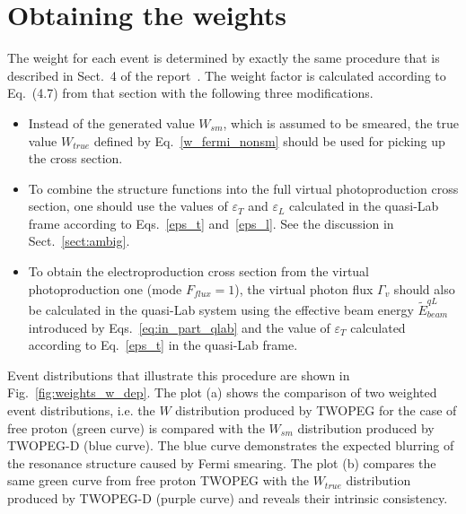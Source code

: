 \newpage
\chapter{Obtaining the weights}
\mbox{}\vspace{-\baselineskip}
\label{sect:weights}

The weight for each event is determined by exactly the same procedure that is described in Sect.~4 of the report~\cite{twopeg}. The weight factor is calculated according to Eq.~(4.7) from that section with the following three modifications.






\begin{itemize}
\item Instead of the generated value $W_{sm}$, which is assumed to be smeared, the true value $W_{true}$ defined by Eq.~\eqref{w_fermi_nonsm} should be used for picking up the cross section. 

\item To combine the structure functions into the full virtual photoproduction cross section, one should use the values of  $\varepsilon_{T}$ and $\varepsilon_{L}$ calculated in the quasi-Lab frame according to Eqs.~\eqref{eps_t} and~\eqref{eps_l}. See the discussion in Sect.~\ref{sect:ambig}.
\item To obtain the electroproduction cross section from the virtual photoproduction one (mode $F_{flux}=1$), the virtual photon flux $\Gamma_{v}$ should also be calculated in the quasi-Lab system using the effective beam energy $\widetilde{E}_{beam}^{qL}$ introduced by Eqs.~\eqref{eq:in_part_qlab} and the value of $\varepsilon_{T}$ calculated according to Eq.~\eqref{eps_t} in the quasi-Lab frame.
\end{itemize}






Event distributions that illustrate this procedure are shown in Fig.~\ref{fig:weights_w_dep}. The plot (a) shows the comparison of two weighted event distributions, i.e. the $W$ distribution produced by TWOPEG for the case of free proton (green curve) is compared with the $W_{sm}$ distribution produced by TWOPEG-D (blue curve). The blue curve demonstrates the expected blurring of the resonance structure caused by Fermi smearing. The plot (b) compares the same green curve from free proton TWOPEG with the $W_{true}$ distribution produced by TWOPEG-D (purple curve) and reveals their intrinsic consistency. 

